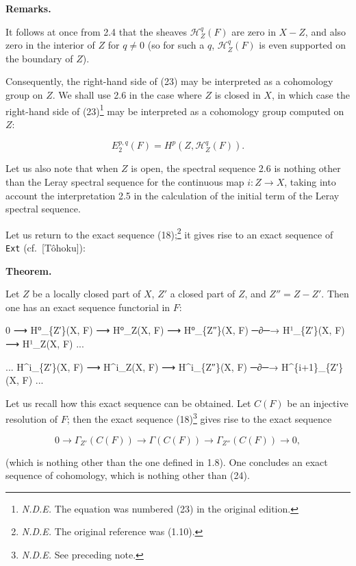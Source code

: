 \documentclass[
]{article}
\newenvironment{Shaded}{}{}
\newcommand{\NormalTok}[1]{#1}
\begin{document}
\textbf{Remarks.}

It follows at once from 2.4 that the sheaves \(\mathcal{H}^{q}_{Z}(F)\)
are zero in \(X - Z\), and also zero in the interior of \(Z\) for
\(q \neq 0\) (so for such a \(q\), \(\mathcal{H}^{q}_{Z}(F)\) is even
supported on the boundary of \(Z\)).

Consequently, the right-hand side of (23) may be interpreted as a
cohomology group on \(Z\). We shall use 2.6 in the case where \(Z\) is
closed in \(X\), in which case the right-hand side of (23)\footnote{\emph{N.D.E.}
  The equation was numbered (23) in the original edition.} may be
interpreted as a cohomology group computed on \(Z\):

\[
E^{p,q}_{2}(F) = H^{p}(Z, \mathcal{H}^{q}_{Z}(F)).
\]

Let us also note that when \(Z\) is open, the spectral sequence 2.6 is
nothing other than the Leray spectral sequence for the continuous map
\(i: Z \to X\), taking into account the interpretation 2.5 in the
calculation of the initial term of the Leray spectral sequence.

Let us return to the exact sequence (18);\footnote{\emph{N.D.E.} The
  original reference was (1.10).} it gives rise to an exact sequence of
\texttt{Ext} (cf.~{[}Tôhoku{]}):

\textbf{Theorem.}

Let \(Z\) be a locally closed part of \(X\), \(Z'\) a closed part of
\(Z\), and \(Z'' = Z - Z'\). Then one has an exact sequence functorial
in \(F\):

\begin{Shaded}
\begin{Highlighting}[]
\NormalTok{0 ⟶ H⁰\_\{Z′\}(X, F) ⟶ H⁰\_Z(X, F) ⟶ H⁰\_\{Z″\}(X, F) ─∂─→ H¹\_\{Z′\}(X, F) ⟶ H¹\_Z(X, F) ...}

\NormalTok{... H\^{}i\_\{Z′\}(X, F) ⟶ H\^{}i\_Z(X, F) ⟶ H\^{}i\_\{Z″\}(X, F) ─∂─→ H\^{}\{i+1\}\_\{Z′\}(X, F) ...}
\end{Highlighting}
\end{Shaded}

Let us recall how this exact sequence can be obtained. Let \(C(F)\) be
an injective resolution of \(F\); then the exact sequence
(18)\footnote{\emph{N.D.E.} See preceding note.} gives rise to the exact
sequence

\[
0 \longrightarrow \Gamma_{Z'}(C(F)) \longrightarrow \Gamma(C(F)) \longrightarrow \Gamma_{Z''}(C(F)) \longrightarrow 0,
\]

(which is nothing other than the one defined in 1.8). One concludes an
exact sequence of cohomology, which is nothing other than (24).
\end{document}
